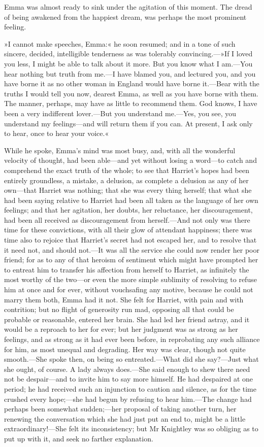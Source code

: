 Emma was almost ready to sink under the agitation of this moment. The dread of being awakened from the happiest dream, was perhaps the most prominent feeling.

»I cannot make speeches, Emma:« he soon resumed; and in a tone of such sincere, decided, intelligible tenderness as was tolerably convincing.—»If I loved you less, I might be able to talk about it more. But you know what I am.—You hear nothing but truth from me.—I have blamed you, and lectured you, and you have borne it as no other woman in England would have borne it.—Bear with the truths I would tell you now, dearest Emma, as well as you have borne with them. The manner, perhaps, may have as little to recommend them. God knows, I have been a very indifferent lover.—But you understand me.—Yes, you see, you understand my feelings—and will return them if you can. At present, I ask only to hear, once to hear your voice.«

While he spoke, Emma's mind was most busy, and, with all the wonderful velocity of thought, had been able—and yet without losing a word—to catch and comprehend the exact truth of the whole; to see that Harriet's hopes had been entirely groundless, a mistake, a delusion, as complete a delusion as any of her own—that Harriet was nothing; that she was every thing herself; that what she had been saying relative to Harriet had been all taken as the language of her own feelings; and that her agitation, her doubts, her reluctance, her discouragement, had been all received as discouragement from herself.—And not only was there time for these convictions, with all their glow of attendant happiness; there was time also to rejoice that Harriet's secret had not escaped her, and to resolve that it need not, and should not.—It was all the service she could now render her poor friend; for as to any of that heroism of sentiment which might have prompted her to entreat him to transfer his affection from herself to Harriet, as infinitely the most worthy of the two—or even the more simple sublimity of resolving to refuse him at once and for ever, without vouchsafing any motive, because he could not marry them both, Emma had it not. She felt for Harriet, with pain and with contrition; but no flight of generosity run mad, opposing all that could be probable or reasonable, entered her brain. She had led her friend astray, and it would be a reproach to her for ever; but her judgment was as strong as her feelings, and as strong as it had ever been before, in reprobating any such alliance for him, as most unequal and degrading. Her way was clear, though not quite smooth.—She spoke then, on being so entreated.—What did she say?—Just what she ought, of course. A lady always does.—She said enough to shew there need not be despair—and to invite him to say more himself. He had despaired at one period; he had received such an injunction to caution and silence, as for the time crushed every hope;—she had begun by refusing to hear him.—The change had perhaps been somewhat sudden;—her proposal of taking another turn, her renewing the conversation which she had just put an end to, might be a little extraordinary!—She felt its inconsistency; but Mr Knightley was so obliging as to put up with it, and seek no farther explanation.

